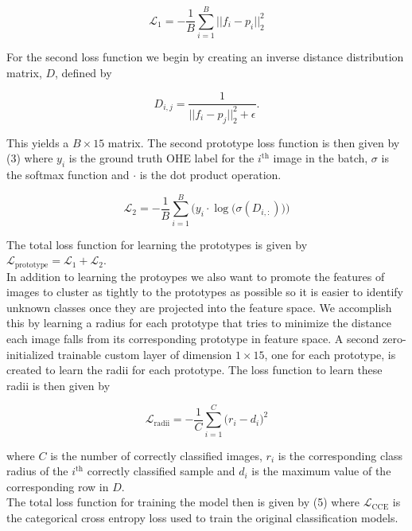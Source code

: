 \documentclass[conference]{IEEEtran}
\begin{document}
\begin{equation}
\mathcal{L}_1 = -\frac{1}{B} \sum_{i = 1}^B ||f_i - p_i ||_2^2
\end{equation}

For the second loss function we begin by creating an inverse distance distribution matrix, $D$, defined by

\begin{equation}
D_{i,j} = \frac{1}{|| f_i - p_j ||_2^2 + \epsilon}.
\end{equation}

This yields a $B \times 15$ matrix. The second prototype loss function is then given by (3) where $y_i$ is the ground truth OHE label for the $i^{\text{th}}$ image in the batch, $\sigma$ is the softmax function and $\cdot$ is the dot product operation.

\begin{equation}
\mathcal{L}_2 = -\frac{1}{B}\sum_{i = 1}^B \bigg( y_i \cdot \log \big( \sigma(D_{i, :}) \big) \bigg)
\end{equation}

The total loss function for learning the prototypes is given by $\mathcal{L}_{\text{prototype}} = \mathcal{L}_1 + \mathcal{L}_2$.\\

In addition to learning the protoypes we also want to promote the features of images to cluster as tightly to the prototypes as possible so it is easier to identify unknown classes once they are projected into the feature space. We accomplish this by learning a radius for each prototype that tries to minimize the distance each image falls from its corresponding prototype in feature space. A second zero-initialized trainable custom layer of dimension $1 \times 15$, one for each prototype, is created to learn the radii for each prototype. The loss function to learn these radii is then given by

\begin{equation}
\mathcal{L}_{\text{radii}} = -\frac{1}{C}\sum_{i = 1}^C \big( r_i - d_i \big)^2
\end{equation}

where $C$ is the number of correctly classified images, $r_i$ is the corresponding class radius of the $i^{\text{th}}$ correctly classified sample and $d_i$ is the maximum value of the corresponding row in $D$.\\

The total loss function for training the model then is given by (5) where $\mathcal{L}_{\text{CCE}}$ is the categorical cross entropy loss used to train the original classification models.
\end{document}
